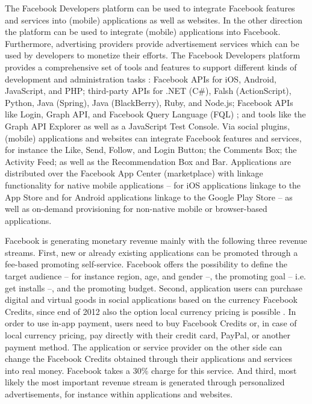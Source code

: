 The Facebook Developers platform can be used to integrate Facebook features and services into (mobile) applications as well as websites. In the other direction the platform can be used to integrate (mobile) applications into Facebook. Furthermore, advertising providers provide advertisement services which can be used by developers to monetize their efforts. The Facebook Developers platform provides a comprehensive set of tools and features to support different kinds of development and administration tasks \citep{Facebook2013a}: Facebook \acp{API} for iOS, Android, JavaScript, and PHP; third-party \acp{API} for .NET (C\#), Falsh (ActionScript), Python, Java (Spring), Java (BlackBerry), Ruby, and Node.js; Facebook \acp{API} like Login, Graph \ac{API}, and Facebook Query Language (FQL) ; and tools like the Graph \ac{API} Explorer as well as a JavaScript Test Console. Via social plugins, (mobile) applications and websites can integrate Facebook features and services, for instance the Like, Send, Follow, and Login Button; the Comments Box; the Activity Feed; as well as the Recommendation Box and Bar. Applications are distributed over the Facebook App Center (marketplace) with linkage functionality for native mobile applications -- for iOS applications linkage to the App Store and for Android applications linkage to the Google Play Store -- as well as on-demand provisioning for non-native mobile or browser-based applications.

Facebook is generating monetary revenue mainly with the following three revenue streams. First, new or already existing applications can be promoted through a fee-based promoting self-service. Facebook offers the possibility to define the target audience -- for instance region, age, and gender --, the promoting goal -- i.e. get installs --, and the promoting budget. Second, application users can purchase digital and virtual goods in social applications based on the currency Facebook Credits, since end of 2012 also the option local currency pricing is possible \citep{Facebook2013a}. In order to use in-app payment, users need to buy Facebook Credits or, in case of local currency pricing, pay directly with their credit card, PayPal, or another payment method. The application or service provider on the other side can change the Facebook Credits obtained through their applications and services into real money. Facebook takes a 30\% charge for this service. And third, most likely the most important revenue stream is generated through personalized advertisements, for instance within applications and websites.

